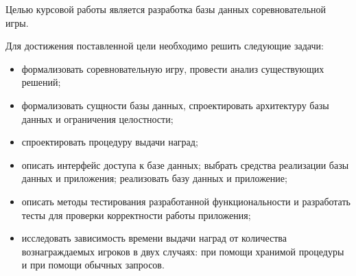 
Целью курсовой работы является разработка базы данных соревновательной игры.
 
Для достижения поставленной цели необходимо решить следующие задачи:
\begin{itemize}
	\item формализовать соревновательную игру, провести анализ существующих решений;
	\item формализовать сущности базы данных, спроектировать архитектуру базы данных и ограничения целостности;
	\item спроектировать процедуру выдачи наград;
	\item описать интерфейс доступа к базе данных; выбрать средства реализации базы данных и приложения; реализовать базу данных и приложение;
	\item описать методы тестирования разработанной функциональности и разработать тесты для проверки корректности работы приложения;
	\item исследовать зависимость времени выдачи наград от количества вознаграждаемых игроков в двух случаях: при помощи хранимой процедуры и при помощи обычных запросов.
\end{itemize}

\clearpage
